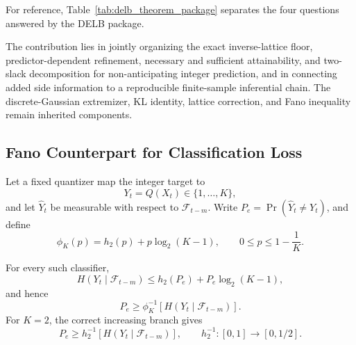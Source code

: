 For reference, Table~\ref{tab:delb_theorem_package} separates the four
questions answered by the DELB package.



\begin{Remark}
\label{rem:claim_hierarchy}
The contribution lies in jointly organizing the exact inverse-lattice floor,
predictor-dependent refinement, necessary and sufficient attainability, and
two-slack decomposition for non-anticipating integer prediction, and in connecting
added side information to a reproducible finite-sample inferential chain.
The discrete-Gaussian extremizer, KL identity, lattice correction, and Fano
inequality remain inherited components.
\end{Remark}



\subsection{Fano Counterpart for Classification Loss}
\label{subsec:fano_counterpart}

Let a fixed quantizer map the integer target to
\begin{equation}
Y_t=Q(X_t)\in\{1,\ldots,K\},
\label{eq:fano_quantized_target}
\end{equation}
and let \(\widehat Y_t\) be measurable with respect to
\(\mathcal F_{t-m}\). Write
\(P_e=\Pr(\widehat Y_t\neq Y_t)\), and define
\begin{equation}
\phi_K(p)=h_2(p)+p\log_2(K-1),
\qquad 0\leq p\leq1-\frac1K.
\label{eq:fano_phi}
\end{equation}

\begin{Proposition}
\label{prop:fano_error_floor}
For every such classifier,
\begin{equation}
H(Y_t\mid\mathcal F_{t-m})
\leq h_2(P_e)+P_e\log_2(K-1),
\label{eq:fano_conditional_inequality}
\end{equation}
and hence
\begin{equation}
P_e\geq
\phi_K^{-1}\!\left[H(Y_t\mid\mathcal F_{t-m})\right].
\label{eq:fano_general_floor}
\end{equation}
For \(K=2\), the correct increasing branch gives
\begin{equation}
P_e\geq
h_2^{-1}\!\left[H(Y_t\mid\mathcal F_{t-m})\right],
\qquad h_2^{-1}:[0,1]\rightarrow[0,1/2].
\label{eq:fano_binary_floor}
\end{equation}
\end{Proposition}

